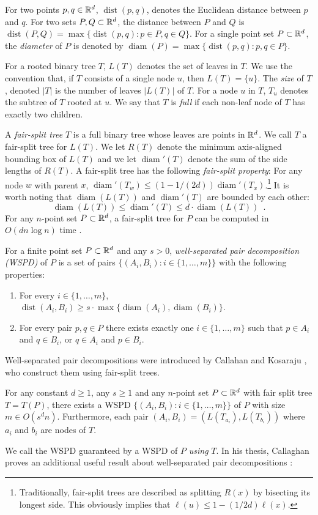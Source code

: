 \documentclass{patmorin}
\DeclareMathOperator{\diam}{diam}
\DeclareMathOperator{\dist}{dist}
\begin{document}
For two points $p,q\in\mathbb{R}^d$, $\dist(p,q)$, denotes the Euclidean distance
between $p$ and $q$. For two sets $P,Q\subset\mathbb{R}^d$, the distance between
$P$ and $Q$ is $\dist(P,Q)=\max\{\dist(p,q):p\in P, q\in Q\}$.  For a
single point set $P\subset\mathbb{R}^d$, the \emph{diameter} of $P$ is denoted
by $\diam(P)=\max\{\dist(p,q):p,q\in P\}$.

For a rooted binary tree $T$, $L(T)$ denotes the set of leaves in
$T$. We use the convention that, if $T$ consists of a single node $u$,
then $L(T)=\{u\}$. The \emph{size} of $T$, denoted $|T|$ is the number of
leaves $|L(T)|$ of $T$. For a node $u$ in $T$, $T_u$ denotes the subtree
of $T$ rooted at $u$.  We say that $T$ is \emph{full} if each non-leaf
node of $T$ has exactly two children.

A \emph{fair-split tree} $T$ is a full binary tree whose
leaves are points in $\mathbb{R}^d$.  We call $T$ a fair-split tree for $L(T)$.
We let $R(T)$ denote the minimum
axis-aligned bounding box of $L(T)$ and we let $\diam'(T)$ denote the
sum of the side lengths of $R(T)$.  A fair-split tree has the following
\emph{fair-split property}: For any node $w$ with parent $x$, $\diam'(T_w)
\le (1-1/(2d))\diam'(T_x)$.\footnote{Traditionally, fair-split trees
are described as splitting $R(x)$ by bisecting its longest side.
This obviously implies that $\ell(u)\le 1-(1/2d)\ell(x)$.} It is worth
noting that $\diam(L(T))$ and $\diam'(T)$ are bounded by each other:
\[
	\diam(L(T)) \le \diam'(T) \le d\cdot\diam(L(T)) \enspace .
\]	
For any $n$-point set $P\subset\mathbb{R}^d$, a fair-split tree for $P$ can be
computed in $O(dn\log n)$ time \cite{callahan.kosaraju:decomposition}.

For a finite point set $P\subset\mathbb{R}^d$ and any $s>0$,
\emph{well-separated pair decomposition (WSPD)} of $P$ is a set of pairs
$\{(A_i,B_i):i\in\{1,\ldots,m\}\}$ with the following properties:
\begin{enumerate}
  \item For every $i\in\{1,\ldots,m\}$, 
    $\dist(A_i,B_i)\ge s\cdot\max\{\diam(A_i),\diam(B_i)\}$.
  \item For every pair $p,q\in P$ there exists exactly one
    $i\in\{1,\ldots,m\}$ such that $p\in A_i$ and $q\in B_i$, or $q\in A_i$
    and $p\in B_i$.
\end{enumerate}
Well-separated pair decompositions were introduced by Callahan and
Kosaraju \cite{callahan.kosaraju:decomposition}, who construct them
using fair-split trees.

\begin{thm}
  For any constant $d\ge 1$, any $s\ge 1$ and any $n$-point set
  $P\subset\mathbb{R}^d$ with fair split tree $T=T(P)$, there exists a WSPD
  $\{(A_i,B_i):i\in\{1,\ldots,m\}\}$ of $P$ with size $m\in O(s^d n)$.
  Furthermore, each pair $(A_i,B_i)=(L(T_{a_i}),L(T_{b_i}))$ where $a_i$
  and $b_i$ are nodes of $T$.
\end{thm}
We call the WSPD guaranteed by  a WSPD of $P$ \emph{using}
$T$.  In his thesis, Callaghan proves an additional useful result about
well-separated pair decompositions \cite[Section~4.5]{callahan:dealing}:
\end{document}
